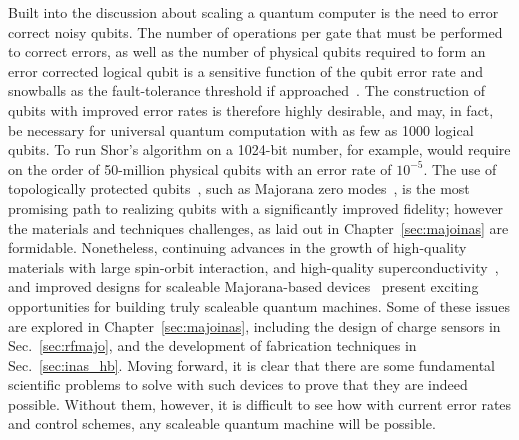 Built into the discussion about scaling a quantum computer is the need to error correct noisy qubits. The number of operations per gate that must be performed to correct errors,
as well as the number of physical qubits required to form an error corrected logical qubit is a sensitive function of the qubit error rate and snowballs as the fault-tolerance
threshold if approached~\cite{6657074,nature23460}. The construction of qubits with improved error rates is therefore highly desirable, and may, in fact, be necessary for universal
quantum computation with as few as 1000 logical qubits. To run Shor's algorithm on a 1024-bit number, for example, would require on the order of 50-million physical qubits with
an error rate of $10^{-5}$. The use of topologically protected qubits~\cite{RevModPhys.80.1083}, such as Majorana zero modes~\cite{s41578-018-0003-1}, is the most promising path
to realizing qubits with a significantly improved fidelity; however the materials and techniques challenges, as laid out in Chapter~\ref{sec:majoinas} are formidable.
Nonetheless, continuing advances in the growth of high-quality materials with large spin-orbit interaction, and high-quality superconductivity~\cite{PhysRevLett.119.136803},
and improved designs for scaleable Majorana-based devices~\cite{PhysRevB.95.235305,Plugge} present exciting opportunities for building truly scaleable quantum machines.
Some of these issues are explored in Chapter~\ref{sec:majoinas}, including the design of charge sensors in Sec.~\ref{sec:rfmajo}, and the development of fabrication techniques
in Sec.~\ref{sec:inas_hb}. Moving forward, it is clear that there are some fundamental scientific problems to solve with such devices to prove that they are indeed possible.
Without them, however, it is difficult to see how with current error rates and control schemes, any scaleable quantum machine will be possible.

